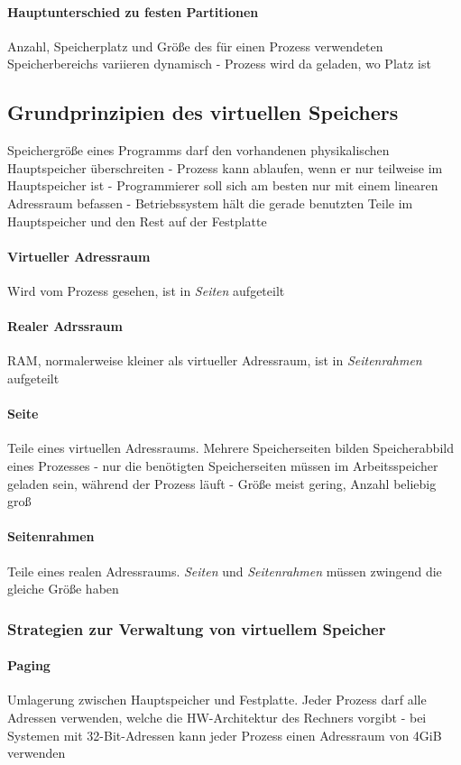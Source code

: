 \documentclass[11pt,a4paper,landscape]{article}
\begin{document}
\begin{multicols*}{3}
	\paragraph{Hauptunterschied zu festen Partitionen} Anzahl, Speicherplatz und Größe des für einen Prozess verwendeten Speicherbereichs variieren dynamisch - Prozess wird da geladen, wo Platz ist
	\subsection{Grundprinzipien des virtuellen Speichers}
	Speichergröße eines Programms darf den vorhandenen physikalischen Hauptspeicher überschreiten - Prozess kann ablaufen, wenn er nur teilweise im Hauptspeicher ist - Programmierer soll sich am besten nur mit einem linearen Adressraum befassen - Betriebssystem hält die gerade benutzten Teile im Hauptspeicher und den Rest auf der Festplatte
	\paragraph{Virtueller Adressraum} Wird vom Prozess gesehen, ist in \textit{Seiten} aufgeteilt
	\paragraph{Realer Adrssraum} RAM, normalerweise kleiner als virtueller Adressraum, ist in \textit{Seitenrahmen} aufgeteilt
	\paragraph{Seite} Teile eines virtuellen Adressraums. Mehrere Speicherseiten bilden Speicherabbild eines Prozesses - nur die benötigten Speicherseiten müssen im Arbeitsspeicher geladen sein, während der Prozess läuft - Größe meist gering, Anzahl beliebig groß
	\paragraph{Seitenrahmen} Teile eines realen Adressraums. \textit{Seiten} und \textit{Seitenrahmen} müssen zwingend die gleiche Größe haben
	\subsubsection{Strategien zur Verwaltung von virtuellem Speicher}
	\paragraph{Paging} Umlagerung zwischen Hauptspeicher und Festplatte. Jeder Prozess darf alle Adressen verwenden, welche die HW-Architektur des Rechners vorgibt - bei Systemen mit 32-Bit-Adressen kann jeder Prozess einen Adressraum von 4GiB verwenden

\end{multicols*}
\end{document}
